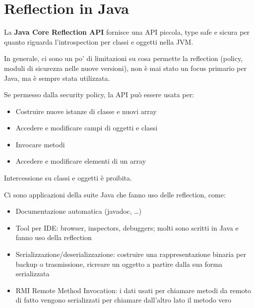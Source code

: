 \section{Reflection in Java}


La \textbf{Java Core Reflection API} fornisce una API piccola, type safe e sicura per quanto riguarda l'introspection per classi e oggetti nella JVM.

In generale, ci sono un po' di limitazioni su cosa permette la reflection (policy, moduli di sicurezza nelle nuove versioni), non è mai stato un focus primario per Java, ma è sempre stata utilizzata.

Se permesso dalla security policy, la API può essere usata per:
\begin{itemize}
	\item Costruire nuove istanze di classe e nuovi array

	\item Accedere e modificare campi di oggetti e classi

	\item Invocare metodi

	\item Accedere e modificare elementi di un array
\end{itemize}
Intercessione su classi e oggetti è proibita.

Ci sono applicazioni della suite Java che fanno uso delle reflection, come:
\begin{itemize}
	\item Documentazione automatica (javadoc, \dots)

	\item Tool per IDE: browser, inspectors, debuggers; molti sono scritti in Java e fanno uso della reflection

	\item Serializzazione/deserializzazione: costruire una rappresentazione binaria per backup o trasmissione, ricreare un oggetto a partire dalla sua forma serializzata

	\item RMI Remote Method Invocation: i dati usati per chiamare metodi da remoto di fatto vengono serializzati per chiamare dall'altro lato il metodo vero
\end{itemize}


